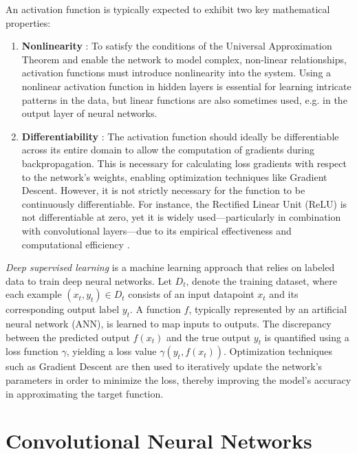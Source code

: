 An activation function is typically expected to exhibit two key mathematical properties:
\begin{enumerate}
  \item \textbf{Nonlinearity} \autocite{augustine2024surveyuniversalapproximationtheorems}: To satisfy the conditions of the Universal Approximation Theorem and enable the network to model complex, non-linear relationships, activation functions must introduce nonlinearity into the system. Using a nonlinear activation function in hidden layers is essential for learning intricate patterns in the data, but linear functions are also sometimes used, e.g. in the output layer of neural networks.
  \item \textbf{Differentiability} \autocite{sharma2017activation}: The activation function should ideally be differentiable across its entire domain to allow the computation of gradients during backpropagation. This is necessary for calculating loss gradients with respect to the network’s weights, enabling optimization techniques like Gradient Descent. However, it is not strictly necessary for the function to be continuously differentiable. For instance, the Rectified Linear Unit (ReLU) is not differentiable at zero, yet it is widely used—particularly in combination with convolutional layers—due to its empirical effectiveness and computational efficiency \autocite{alzubaidi2021review}.
\end{enumerate}

\begin{definition}
  \textit{Deep supervised learning} \autocite{alzubaidi2021review} \autocite{cun2015deeplearning} \autocite{oshea2015introductionconvolutionalneuralnetworks} is a machine learning approach that relies on labeled data to train deep neural networks. Let \(D_t\), denote the training dataset, where each example \((x_t, y_t) \in D_t\) consists of an input datapoint \(x_t\) and its corresponding output label \(y_t\). A function \(f\), typically represented by an artificial neural network (ANN), is learned to map inputs to outputs. The discrepancy between the predicted output \(f(x_t)\) and the true output \(y_t\) is quantified using a loss function \(\gamma\), yielding a loss value \(\gamma(y_t, f(x_t))\). Optimization techniques such as Gradient Descent are then used to iteratively update the network’s parameters in order to minimize the loss, thereby improving the model’s accuracy in approximating the target function.
\end{definition}

\section{Convolutional Neural Networks}

